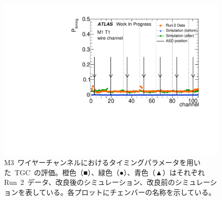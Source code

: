 \begin{figure}[htbp]
\begin{minipage}{0.49\hsize}
			\end{minipage}
			\begin{minipage}{0.49\hsize}
			\centering
			\includegraphics[width=\textwidth,page=34]{img/pdf5/master_timingplot_comp.pdf}
			\end{minipage}
			\caption[M3~ワイヤーチャンネルにおけるタイミングパラメータを用いた~TGC~の評価。]{M3~ワイヤーチャンネルにおけるタイミングパラメータを用いた~TGC~の評価。橙色（■）、緑色（●）、青色（▲）はそれぞれRun~2~データ、改良後のシミュレーション、改良前のシミュレーションを表している。各プロットにチェンバーの名称を示している。}
		\label{fig:timingPlotCompWireM3}
	\end{figure}
	
